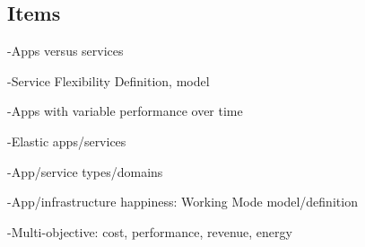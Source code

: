 \subsection{Items}
-Apps versus services

-Service Flexibility Definition, model

-Apps with variable performance over time

-Elastic apps/services

-App/service types/domains

-App/infrastructure happiness: Working Mode model/definition

-Multi-objective: cost, performance, revenue, energy


